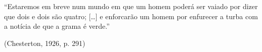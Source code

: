 \begin{epigrafe}
	\vspace*{\fill}
	{%
		\noindent\hspace{.5\textwidth}
		{\begin{minipage}{.5\textwidth}
				``Estaremos em breve num mundo em que um homem poderá ser vaiado por dizer que dois e dois são quatro; [\ldots] e enforcarão um homem por enfurecer a turba com a notícia de que a grama é verde.''

				\medskip
				\noindent\hspace*{\fill}(Chesterton, 1926, p. 291)

			\end{minipage}}%
		\vspace*{3cm}
	}%
\end{epigrafe}
